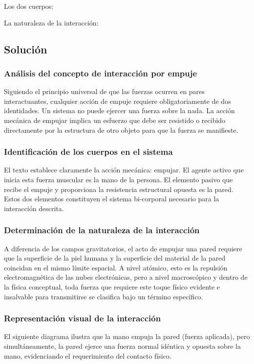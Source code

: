 \documentclass[12pt, a4paper]{article}
\begin{document}
Los dos cuerpos: \underline{\hspace{8cm}}

La naturaleza de la interacción: \underline{\hspace{8cm}}

\subsection*{Solución}

\subsubsection*{Análisis del concepto de interacción por empuje}
Siguiendo el principio universal de que las fuerzas ocurren en pares interactuantes, cualquier acción de empuje requiere obligatoriamente de dos identidades. Un sistema no puede ejercer una fuerza sobre la nada. La acción mecánica de empujar implica un esfuerzo que debe ser resistido o recibido directamente por la estructura de otro objeto para que la fuerza se manifieste.

\subsubsection*{Identificación de los cuerpos en el sistema}
El texto establece claramente la acción mecánica: empujar. El agente activo que inicia esta fuerza muscular es la mano de la persona. El elemento pasivo que recibe el empuje y proporciona la resistencia estructural opuesta es la pared. Estos dos elementos constituyen el sistema bi-corporal necesario para la interacción descrita.

\subsubsection*{Determinación de la naturaleza de la interacción}
A diferencia de los campos gravitatorios, el acto de empujar una pared requiere que la superficie de la piel humana y la superficie del material de la pared coincidan en el mismo límite espacial. A nivel atómico, esto es la repulsión electromagnética de las nubes electrónicas, pero a nivel macroscópico y dentro de la física conceptual, toda fuerza que requiere este toque físico evidente e insalvable para transmitirse se clasifica bajo un término específico.

\subsubsection*{Representación visual de la interacción}
El siguiente diagrama ilustra que la mano empuja la pared (fuerza aplicada), pero simultáneamente, la pared ejerce una fuerza normal idéntica y opuesta sobre la mano, evidenciando el requerimiento del contacto físico.
\end{document}
